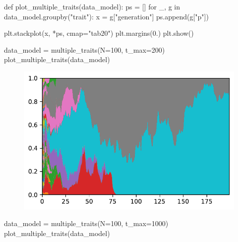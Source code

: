 \documentclass[
  a4paperpaper,
  ,captions=tableheading
]{scrbook}
\newenvironment{Shaded}{\begin{snugshade}}{\end{snugshade}}
\newcommand{\ControlFlowTok}[1]{\textcolor[rgb]{0.00,0.23,0.31}{#1}}
\newcommand{\DecValTok}[1]{\textcolor[rgb]{0.68,0.00,0.00}{#1}}
\newcommand{\FloatTok}[1]{\textcolor[rgb]{0.68,0.00,0.00}{#1}}
\newcommand{\KeywordTok}[1]{\textcolor[rgb]{0.00,0.23,0.31}{#1}}
\newcommand{\NormalTok}[1]{\textcolor[rgb]{0.00,0.23,0.31}{#1}}
\newcommand{\OperatorTok}[1]{\textcolor[rgb]{0.37,0.37,0.37}{#1}}
\newcommand{\StringTok}[1]{\textcolor[rgb]{0.13,0.47,0.30}{#1}}
\begin{document}
\begin{Shaded}
\begin{Highlighting}[]
\KeywordTok{def}\NormalTok{ plot\_multiple\_traits(data\_model):}
\NormalTok{    ps }\OperatorTok{=}\NormalTok{ []}
    \ControlFlowTok{for}\NormalTok{ \_, g }\KeywordTok{in}\NormalTok{ data\_model.groupby(}\StringTok{"trait"}\NormalTok{):}
\NormalTok{        x }\OperatorTok{=}\NormalTok{ g[}\StringTok{"generation"}\NormalTok{]}
\NormalTok{        ps.append(g[}\StringTok{"p"}\NormalTok{])}

\NormalTok{    plt.stackplot(x, }\OperatorTok{*}\NormalTok{ps, cmap}\OperatorTok{=}\StringTok{"tab20"}\NormalTok{)}
\NormalTok{    plt.margins(}\FloatTok{0.}\NormalTok{)}
\NormalTok{    plt.show()}
\end{Highlighting}
\end{Shaded}

\begin{Shaded}
\begin{Highlighting}[]
\NormalTok{data\_model }\OperatorTok{=}\NormalTok{ multiple\_traits(N}\OperatorTok{=}\DecValTok{100}\NormalTok{, t\_max}\OperatorTok{=}\DecValTok{200}\NormalTok{)}
\NormalTok{plot\_multiple\_traits(data\_model)}
\end{Highlighting}
\end{Shaded}

\begin{figure}[H]

{\centering \includegraphics{chapter09_files/figure-pdf/cell-6-output-1.pdf}

}

\end{figure}

\begin{Shaded}
\begin{Highlighting}[]
\NormalTok{data\_model }\OperatorTok{=}\NormalTok{ multiple\_traits(N}\OperatorTok{=}\DecValTok{100}\NormalTok{, t\_max}\OperatorTok{=}\DecValTok{1000}\NormalTok{)}
\NormalTok{plot\_multiple\_traits(data\_model)}
\end{Highlighting}
\end{Shaded}
\end{document}
